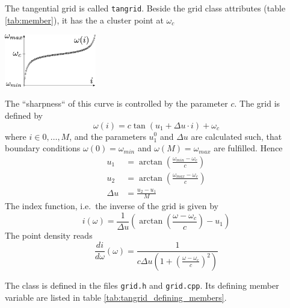 The tangential grid is called \texttt{tangrid}. Beside the grid class attributes (table \ref{tab:member}), it has the a cluster point at $\omega_c$ \\

\begin{center}
	\includegraphics[width=0.3\textwidth]{pics/tangrid.eps}
\end{center}

\noindent The ``sharpness`` of this curve is controlled by the parameter $c$. The grid is defined by
\[
	\omega(i)= c \tan (u_1+\Delta u \cdot i) + \omega_c
\]
where $i\in {0,\dots,M}$, and the parameters $u^0_1$ and $\Delta u$ are calculated such, that boundary conditions $\omega(0)=\omega_{min}$ and $\omega(M)=\omega_{max}$ are fulfilled. Hence
\begin{align*}
	u_1&=\arctan\left(\frac{\omega_{min}-\omega_c}{c}\right)\\
	u_2&=\arctan\left(\frac{\omega_{max}-\omega_c}{c}\right)\\
	\Delta u&=\frac{u_2-u_1}{M}
\end{align*}
The index function, i.e.~the inverse of the grid is given by
\[
	i(\omega)=\frac{1}{\Delta u}\left(\arctan\left(\frac{\omega-\omega_c}{c}\right)-u_1\right)
\]
The point density reads
\begin{equation}\label{eqn:tangrid_grid_point_density}
 \frac{di}{d\omega} (\omega) = \frac{1}{c \Delta u\left(1+\left(\frac{\omega-\omega_c}{c}\right)^2\right)}
\end{equation}

The class is defined in the files \texttt{grid.h} and \texttt{grid.cpp}. Its defining member variable are listed in table \ref{tab:tangrid_defining_members}.

